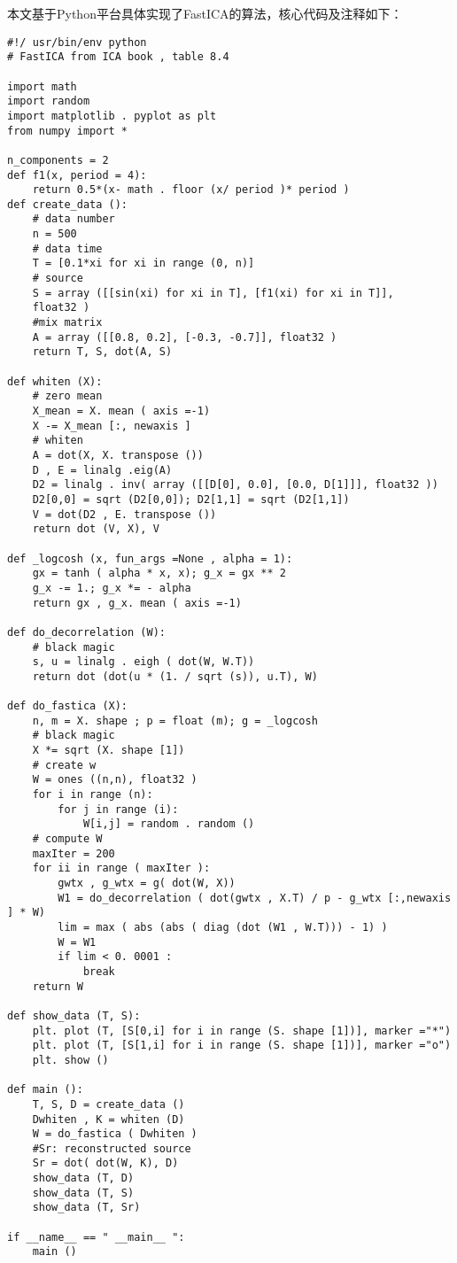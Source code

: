 本文基于Python平台具体实现了FastICA的算法，核心代码及注释如下：

\begin{verbatim}
#!/ usr/bin/env python
# FastICA from ICA book , table 8.4

import math
import random
import matplotlib . pyplot as plt
from numpy import *

n_components = 2
def f1(x, period = 4):
    return 0.5*(x- math . floor (x/ period )* period )
def create_data ():
    # data number
    n = 500
    # data time
    T = [0.1*xi for xi in range (0, n)]
    # source
    S = array ([[sin(xi) for xi in T], [f1(xi) for xi in T]],
    float32 )
    #mix matrix
    A = array ([[0.8, 0.2], [-0.3, -0.7]], float32 )
    return T, S, dot(A, S)

def whiten (X):
    # zero mean
    X_mean = X. mean ( axis =-1)
    X -= X_mean [:, newaxis ]
    # whiten
    A = dot(X, X. transpose ())
    D , E = linalg .eig(A)
    D2 = linalg . inv( array ([[D[0], 0.0], [0.0, D[1]]], float32 ))
    D2[0,0] = sqrt (D2[0,0]); D2[1,1] = sqrt (D2[1,1])
    V = dot(D2 , E. transpose ())
    return dot (V, X), V

def _logcosh (x, fun_args =None , alpha = 1):
    gx = tanh ( alpha * x, x); g_x = gx ** 2
    g_x -= 1.; g_x *= - alpha
    return gx , g_x. mean ( axis =-1)

def do_decorrelation (W):
    # black magic
    s, u = linalg . eigh ( dot(W, W.T))
    return dot (dot(u * (1. / sqrt (s)), u.T), W)

def do_fastica (X):
    n, m = X. shape ; p = float (m); g = _logcosh
    # black magic
    X *= sqrt (X. shape [1])
    # create w
    W = ones ((n,n), float32 )
    for i in range (n):
        for j in range (i):
            W[i,j] = random . random ()
    # compute W
    maxIter = 200
    for ii in range ( maxIter ):
        gwtx , g_wtx = g( dot(W, X))
        W1 = do_decorrelation ( dot(gwtx , X.T) / p - g_wtx [:,newaxis ] * W)
        lim = max ( abs (abs ( diag (dot (W1 , W.T))) - 1) )
        W = W1
        if lim < 0. 0001 :
            break
    return W

def show_data (T, S):
    plt. plot (T, [S[0,i] for i in range (S. shape [1])], marker ="*")
    plt. plot (T, [S[1,i] for i in range (S. shape [1])], marker ="o")
    plt. show ()

def main ():
    T, S, D = create_data ()
    Dwhiten , K = whiten (D)
    W = do_fastica ( Dwhiten )
    #Sr: reconstructed source
    Sr = dot( dot(W, K), D)
    show_data (T, D)
    show_data (T, S)
    show_data (T, Sr)

if __name__ == " __main__ ":
    main ()
\end{verbatim}